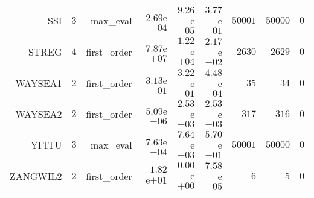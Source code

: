 \begin{longtable}{rrrrrrrrr}
SSI & \(     3\) & max\_eval & \( 2.69\)e\(-04\) & \( 9.26\)e\(-05\) & \( 3.77\)e\(-01\) & \( 50001\) & \( 50000\) & \(     0\) \\
STREG & \(     4\) & first\_order & \( 7.87\)e\(+07\) & \( 1.22\)e\(+04\) & \( 2.17\)e\(-02\) & \(  2630\) & \(  2629\) & \(     0\) \\
WAYSEA1 & \(     2\) & first\_order & \( 3.13\)e\(-01\) & \( 3.22\)e\(-01\) & \( 4.48\)e\(-04\) & \(    35\) & \(    34\) & \(     0\) \\
WAYSEA2 & \(     2\) & first\_order & \( 5.09\)e\(-06\) & \( 2.53\)e\(-03\) & \( 2.53\)e\(-03\) & \(   317\) & \(   316\) & \(     0\) \\
YFITU & \(     3\) & max\_eval & \( 7.63\)e\(-04\) & \( 7.64\)e\(-03\) & \( 5.70\)e\(-01\) & \( 50001\) & \( 50000\) & \(     0\) \\
ZANGWIL2 & \(     2\) & first\_order & \(-1.82\)e\(+01\) & \( 0.00\)e\(+00\) & \( 7.58\)e\(-05\) & \(     6\) & \(     5\) & \(     0\) \\\hline
\end{longtable}
